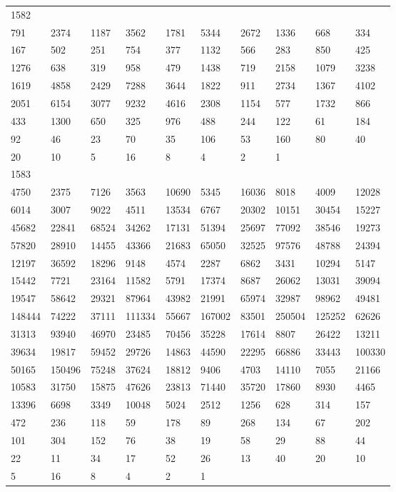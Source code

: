 \begin{longtable}{*{10}{l}}
1582&&&&&&&&&\\
791& 2374& 1187& 3562& 1781& 5344& 2672& 1336& 668& 334\\
167& 502& 251& 754& 377& 1132& 566& 283& 850& 425\\
1276& 638& 319& 958& 479& 1438& 719& 2158& 1079& 3238\\
1619& 4858& 2429& 7288& 3644& 1822& 911& 2734& 1367& 4102\\
2051& 6154& 3077& 9232& 4616& 2308& 1154& 577& 1732& 866\\
433& 1300& 650& 325& 976& 488& 244& 122& 61& 184\\
92& 46& 23& 70& 35& 106& 53& 160& 80& 40\\
20& 10& 5& 16& 8& 4& 2& 1& \\

1583&&&&&&&&&\\
4750& 2375& 7126& 3563& 10690& 5345& 16036& 8018& 4009& 12028\\
6014& 3007& 9022& 4511& 13534& 6767& 20302& 10151& 30454& 15227\\
45682& 22841& 68524& 34262& 17131& 51394& 25697& 77092& 38546& 19273\\
57820& 28910& 14455& 43366& 21683& 65050& 32525& 97576& 48788& 24394\\
12197& 36592& 18296& 9148& 4574& 2287& 6862& 3431& 10294& 5147\\
15442& 7721& 23164& 11582& 5791& 17374& 8687& 26062& 13031& 39094\\
19547& 58642& 29321& 87964& 43982& 21991& 65974& 32987& 98962& 49481\\
148444& 74222& 37111& 111334& 55667& 167002& 83501& 250504& 125252& 62626\\
31313& 93940& 46970& 23485& 70456& 35228& 17614& 8807& 26422& 13211\\
39634& 19817& 59452& 29726& 14863& 44590& 22295& 66886& 33443& 100330\\
50165& 150496& 75248& 37624& 18812& 9406& 4703& 14110& 7055& 21166\\
10583& 31750& 15875& 47626& 23813& 71440& 35720& 17860& 8930& 4465\\
13396& 6698& 3349& 10048& 5024& 2512& 1256& 628& 314& 157\\
472& 236& 118& 59& 178& 89& 268& 134& 67& 202\\
101& 304& 152& 76& 38& 19& 58& 29& 88& 44\\
22& 11& 34& 17& 52& 26& 13& 40& 20& 10\\
5& 16& 8& 4& 2& 1& \\


\end{longtable}
